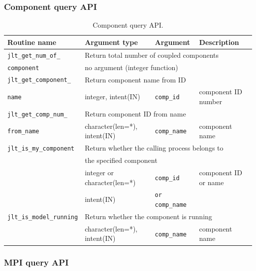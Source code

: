 \documentclass[11pt,a4paper]{report}
\begin{document}
\subsubsection{Component query API}

\begin{table}[H]
\begin{center}
\caption{Component query API.}
{\small
\label{table:jlt_api_comp_query}
\begin{tabular}{llll}
\hline\hline
Routine name & Argument type & Argument & Description \\
\hline
 \texttt{jlt\_get\_num\_of\_} & \multicolumn{3}{l}{Return total number of coupled components}\\
 \texttt{component}
           & \multicolumn{3}{l}{no argument (integer function)}\\
\hline
 \texttt{jlt\_get\_component\_} & \multicolumn{3}{l}{Return component name from ID}\\
 \texttt{name}
           & integer, intent(IN) & \texttt{comp\_id} & component ID number\\
\hline
 \texttt{jlt\_get\_comp\_num\_} & \multicolumn{3}{l}{Return component ID from name}\\
 \texttt{from\_name}
           & character(len=*), intent(IN) & \texttt{comp\_name} & component name\\
\hline
 \texttt{jlt\_is\_my\_component} & \multicolumn{3}{l}{Return whether the calling process belongs to}\\
           & \multicolumn{3}{l}{the specified component}\\
           & integer or character(len=*) & \texttt{comp\_id} & component ID or name\\
           & intent(IN) & \texttt{or comp\_name} & \\
\hline
 \texttt{jlt\_is\_model\_running} & \multicolumn{3}{l}{Return whether the component is running}\\
           & character(len=*), intent(IN) & \texttt{comp\_name} & component name\\
\hline\hline
\end{tabular}
}
\end{center}
\end{table}

\subsubsection{MPI query API}
\end{document}

